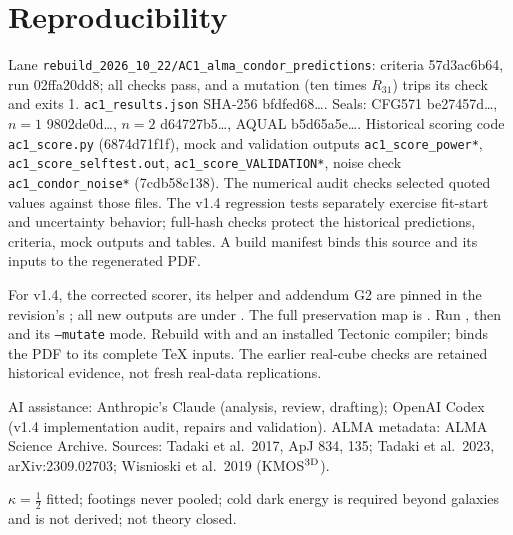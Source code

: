 \documentclass[10pt]{article}
\begin{document}
\section{Reproducibility}
Lane \texttt{rebuild\_2026\_10\_22/AC1\_alma\_condor\_predictions}: criteria 57d3ac6b64, run 02ffa20dd8; all checks pass, and a mutation (ten times $R_{31}$) trips its check and exits 1. \texttt{ac1\_results.json} SHA-256 bfdfed68\ldots. Seals: CFG571 be27457d\ldots, $n=1$ 9802de0d\ldots, $n=2$ d64727b5\ldots, AQUAL b5d65a5e\ldots. Historical scoring code \texttt{ac1\_score.py} (6874d71f1f), mock and validation outputs \texttt{ac1\_score\_power*}, \texttt{ac1\_score\_selftest.out}, \texttt{ac1\_score\_VALIDATION*}, noise check \texttt{ac1\_condor\_noise*} (7cdb58c138). The numerical audit checks selected quoted values against those files. The v1.4 regression tests separately exercise fit-start and uncertainty behavior; full-hash checks protect the historical predictions, criteria, mock outputs and tables. A build manifest binds this source and its inputs to the regenerated PDF.

For v1.4, the corrected scorer, its helper and addendum G2 are pinned in the revision's ; all new outputs are under . The full preservation map is . Run , then  and its \texttt{--mutate} mode. Rebuild with  and an installed Tectonic compiler;  binds the PDF to its complete TeX inputs. The earlier real-cube checks are retained historical evidence, not fresh real-data replications.

\small AI assistance: Anthropic's Claude (analysis, review, drafting); OpenAI Codex (v1.4 implementation audit, repairs and validation). ALMA metadata: ALMA Science Archive. Sources: Tadaki et al.\ 2017, ApJ 834, 135; Tadaki et al.\ 2023, arXiv:2309.02703; Wisnioski et al.\ 2019 (KMOS$^{\rm 3D}$).

$\kappa=\tfrac12$ fitted; footings never pooled; cold dark energy is required beyond galaxies and is not derived; not theory closed.
\end{document}
